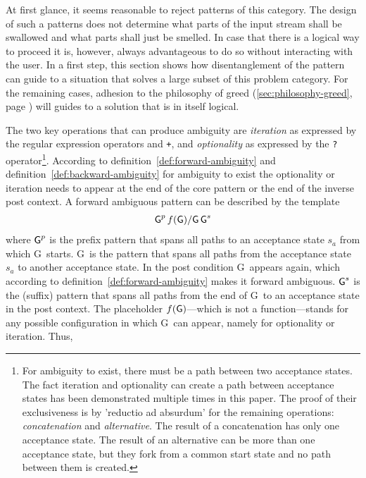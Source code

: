 \documentclass[acmtoplas]{acmtrans2m}
\newcommand{\defref}[1]{definition~\ref{def:#1}}
\newcommand{\pG}{{\sf G}}
\newcommand{\mpG}{\mbox{\sf G}}
\newcommand{\corepatternf}[1]{\mbox{\sf #1}^p  \,f(\mbox{\sf #1})}
\newcommand{\postcontext}[1] {\mbox{\sf #1}    \,  \mbox{\sf #1}^s}
\begin{document}
At first glance, it seems reasonable to reject patterns of this category.  The
design of such a patterns does not determine what parts of the input stream
shall be swallowed and what parts shall just be smelled. In case that there is
a logical way to proceed it is, however, always advantageous to do so without
interacting with the user.  In a first step, this section shows how
disentanglement of the pattern can guide to a situation that solves a large
subset of this problem category.  For the remaining cases, adhesion to the
philosophy of greed (\ref{sec:philosophy-greed}, page
                     \pageref{sec:philosophy-greed}) will guides to a solution
that is in itself logical. 

The two key operations that can produce ambiguity are {\it iteration} as expressed by the
regular expression operators {\tt *} and {\tt +}, and {\it optionality} as expressed by
the {\tt ?} operator\footnote{
    For ambiguity to exist, there must be a path between two acceptance
    states. The fact iteration and optionality can create a path between
        acceptance states has been demonstrated multiple times in this paper.
        The proof of their exclusiveness is by 'reductio ad absurdum' for the
        remaining operations: {\it concatenation} and {\it alternative}. The result of a concatenation has only one
        acceptance state. The result of an alternative can be more than
        one acceptance state, but they fork from a common start state and no
        path between them is created.}. 
According to \defref{forward-ambiguity} and \defref{backward-ambiguity}
for ambiguity to exist the optionality or iteration needs to appear at the end of the
core pattern or the end of the inverse post context. A forward ambiguous
pattern can be described by the template
\begin{eqnarray}
           \corepatternf{G} / \postcontext{G} 
\end{eqnarray}
where $\mpG^p$ is the prefix pattern that spans all paths to an acceptance state $s_a$ from which \pG\ starts.
\pG\ is the pattern that spans all paths from the acceptance state $s_a$ to another acceptance state.
In the post condition \pG\ appears again, which according to \defref{forward-ambiguity} makes
it forward ambiguous. $\mpG^s$ is the (suffix) pattern that spans all paths from the end of \pG\ to 
an acceptance state in the post context. The placeholder $f(\mpG)$---which is not a function---stands for any possible
configuration in which \pG\ can appear, namely for optionality or iteration. Thus,
\end{document}
